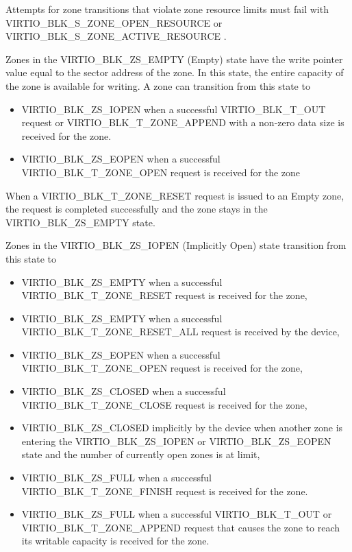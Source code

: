 Attempts for zone transitions that violate zone resource limits must fail with
VIRTIO_BLK_S_ZONE_OPEN_RESOURCE or VIRTIO_BLK_S_ZONE_ACTIVE_RESOURCE
.

Zones in the VIRTIO_BLK_ZS_EMPTY (Empty) state have the write pointer value
equal to the sector address of the zone. In this state, the entire capacity of
the zone is available for writing. A zone can transition from this state to
\begin{itemize}
\item VIRTIO_BLK_ZS_IOPEN when a successful VIRTIO_BLK_T_OUT request or
    VIRTIO_BLK_T_ZONE_APPEND with a non-zero data size is received for the zone.

\item VIRTIO_BLK_ZS_EOPEN when a successful VIRTIO_BLK_T_ZONE_OPEN request is
    received for the zone
\end{itemize}

When a VIRTIO_BLK_T_ZONE_RESET request is issued to an Empty zone, the request
is completed successfully and the zone stays in the VIRTIO_BLK_ZS_EMPTY state.

Zones in the VIRTIO_BLK_ZS_IOPEN (Implicitly Open) state transition from
this state to
\begin{itemize}
\item VIRTIO_BLK_ZS_EMPTY when a successful VIRTIO_BLK_T_ZONE_RESET request is
    received for the zone,

\item VIRTIO_BLK_ZS_EMPTY when a successful VIRTIO_BLK_T_ZONE_RESET_ALL request
    is received by the device,

\item VIRTIO_BLK_ZS_EOPEN when a successful VIRTIO_BLK_T_ZONE_OPEN request is
    received for the zone,

\item VIRTIO_BLK_ZS_CLOSED when a successful VIRTIO_BLK_T_ZONE_CLOSE request is
    received for the zone,

\item VIRTIO_BLK_ZS_CLOSED implicitly by the device when another zone is
    entering the VIRTIO_BLK_ZS_IOPEN or VIRTIO_BLK_ZS_EOPEN state and the number
    of currently open zones is at  limit,

\item VIRTIO_BLK_ZS_FULL when a successful VIRTIO_BLK_T_ZONE_FINISH request is
    received for the zone.

\item VIRTIO_BLK_ZS_FULL when a successful VIRTIO_BLK_T_OUT or
    VIRTIO_BLK_T_ZONE_APPEND request that causes the zone to reach its writable
    capacity is received for the zone.
\end{itemize}

